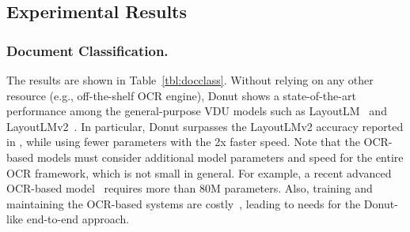 \documentclass[runningheads]{llncs}
\newcommand\ours{{{\mbox{Donut}}}\xspace}
\begin{document}
\subsection{Experimental Results}
\subsubsection{Document Classification.}
The results are shown in Table~\ref{tbl:docclass}.
Without relying on any other resource (e.g., off-the-shelf OCR engine), \ours shows a state-of-the-art performance among the general-purpose VDU models such as LayoutLM~\cite{xu2019_layoutLM} and LayoutLMv2~\cite{xu-etal-2021-layoutlmv2}. 
In particular, \ours surpasses the LayoutLMv2 accuracy reported in \cite{xu-etal-2021-layoutlmv2}, while using fewer parameters with the 2x faster speed. Note that the OCR-based models must consider additional model parameters and speed for the entire OCR framework, which is not small in general. For example, a recent advanced OCR-based model~\cite{baek2019craft,baek2019wrong} requires more than 80M parameters. Also, training and maintaining the OCR-based systems are costly~\cite{hwang2021costeffective}, leading to needs for the \ours-like end-to-end approach.
\end{document}
